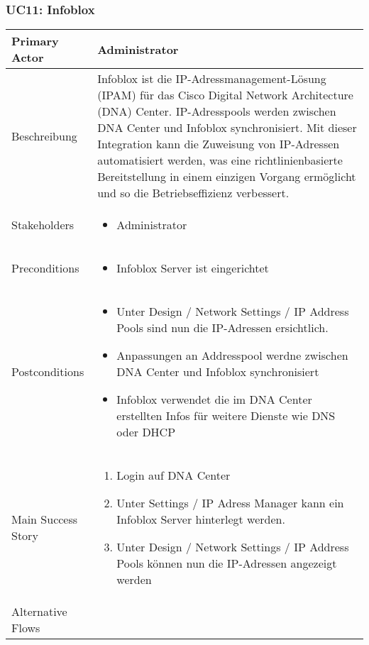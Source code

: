\subsubsection{UC11: Infoblox}
\begin{table}[H]
	\centering
	\begin{tabularx}{\textwidth}{l | X}
		Primary Actor   & Administrator       \\
		\hline
		Beschreibung   & Infoblox ist die IP-Adressmanagement-Lösung (IPAM) für das Cisco Digital Network Architecture (DNA) Center. IP-Adresspools werden zwischen DNA Center und Infoblox synchronisiert. Mit dieser Integration kann die Zuweisung von IP-Adressen automatisiert werden, was eine richtlinienbasierte Bereitstellung in einem einzigen Vorgang ermöglicht und so die Betriebseffizienz verbessert.  \\ 
		\hline
		Stakeholders       & 
		\begin{itemize}
			\item Administrator
		\end{itemize} \\ 
		Preconditions      &
		\begin{itemize}	
			\item Infoblox Server ist eingerichtet
		\end{itemize}  \\
		\hline
		Postconditions     & 
		\begin{itemize}	
			\item Unter Design / Network Settings / IP Address Pools sind nun die IP-Adressen ersichtlich.
			\item Anpassungen an Addresspool werdne zwischen DNA Center und Infoblox synchronisiert
			\item Infoblox verwendet die im DNA Center erstellten Infos für weitere Dienste wie DNS oder DHCP
		\end{itemize}  \\
		\hline
		Main Success Story & 
		\begin{enumerate}
			\item Login auf DNA Center
			\item Unter Settings / IP Adress Manager kann ein Infoblox Server hinterlegt werden.
			\item Unter Design / Network Settings / IP Address Pools können nun die IP-Adressen angezeigt werden
		\end{enumerate}
		\\
		\hline
		Alternative Flows  & 
		\begin{itemize}

\end{itemize}
\end{tabularx}
\end{table}

